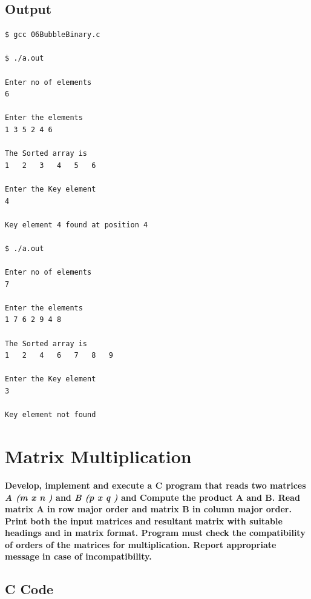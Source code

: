 \documentclass[a4paper]{report}
\begin{document}
\pagebreak
\section*{Output}
\begin{Verbatim}
$ gcc 06BubbleBinary.c 

$ ./a.out 

Enter no of elements
6

Enter the elements
1 3 5 2 4 6

The Sorted array is 
1	2	3	4	5	6	

Enter the Key element
4

Key element 4 found at position 4

$ ./a.out 

Enter no of elements
7

Enter the elements
1 7 6 2 9 4 8

The Sorted array is 
1	2	4	6	7	8	9	

Enter the Key element
3

Key element not found

\end{Verbatim}

\chapter{Matrix Multiplication}
{\selectfont \textbf{Develop, implement and execute a C program that reads two matrices \textit{A (m x n )} and\textit{ B (p x q )} and Compute the product A and B. Read matrix A in row major order and matrix B in column major order. Print both the input matrices and resultant matrix with suitable headings and in matrix format. Program must check the compatibility of orders of the matrices for multiplication. Report appropriate message in case of incompatibility.
}}

\section*{C Code}
\end{document}
